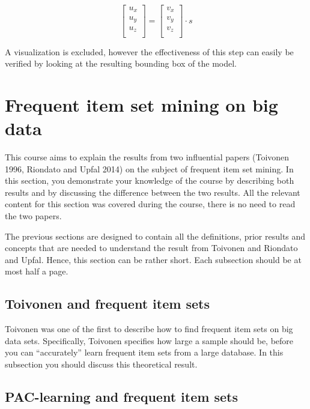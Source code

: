 \documentclass{bigdata}
\begin{document}
\[
\begin{bmatrix}
u_x \\
u_y \\
u_z \\
\end{bmatrix}
=
\begin{bmatrix}
v_x \\
v_y \\
v_z \\
\end{bmatrix}
\cdot s
\]

A visualization is excluded, however the effectiveness of this step can easily be verified by looking at the resulting bounding box of the model.

\newpage

\section{Frequent item set mining on big data}

This course aims to explain the results from two influential papers (Toivonen 1996, Riondato and Upfal 2014) on the subject of frequent item set mining. In this section, you demonstrate your knowledge of the course by describing both results and by discussing the difference between the two results. All the relevant content for this section was covered during the course, there is no need to read the two papers. 

The previous sections are designed to contain all the definitions, prior results and concepts that are needed to understand the result from Toivonen and Riondato and Upfal. Hence, this section can be rather short. Each subsection should be at most half a page.



\subsection{Toivonen and frequent item sets}

Toivonen was one of the first to describe how to find frequent item sets on big data sets. Specifically, Toivonen specifies how large a sample should be, before you can ``accurately'' learn frequent item sets from a large database. In this subsection you should discuss this theoretical result.

\subsection{PAC-learning and frequent item sets}
\end{document}
